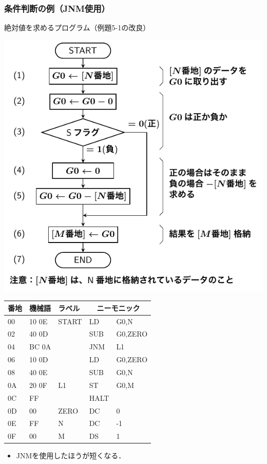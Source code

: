 \documentclass{beamer}                 %
\begin{document}
\begin{frame}
  \frametitle{条件判断の例（JNM使用）}
  絶対値を求めるプログラム（例題5-1の改良）\\
  \vfill
  \begin{minipage}{0.49\columnwidth}
    \centerline{\includegraphics[scale=0.5]{../Tikz/flow1.pdf}}
  \end{minipage}
  \begin{minipage}{0.5\columnwidth}
    {\ttfamily\scriptsize\begin{center}
      \begin{tabular}{|l|l|l|l l|}
        \hline
        番地 & 機械語 & ラベル & \multicolumn{2}{|c|}{ニーモニック} \\
        \hline
        00 & 10 0E & START& LD   & G0,N    \\
        02 & 40 0D &      & SUB  & G0,ZERO \\
        04 & BC 0A &      & JNM  & L1      \\
        06 & 10 0D &      & LD   & G0,ZERO \\
        08 & 40 0E &      & SUB  & G0,N    \\
        0A & 20 0F & L1   & ST   & G0,M    \\
        0C & FF    &      & HALT &         \\
        0D & 00    & ZERO & DC   & 0       \\
        0E & FF    & N    & DC   & -1      \\
        0F & 00    & M    & DS   & 1       \\
        \hline
      \end{tabular}
    \end{center}}
  \end{minipage}
  \vfill
  \begin{itemize}
  \item JNMを使用したほうが短くなる．
  \end{itemize}
\end{frame}
\end{document}
